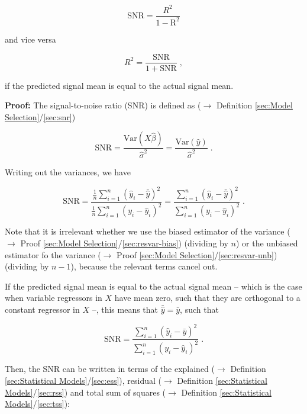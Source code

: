 \documentclass[a4paper,12pt,twoside]{book}
\begin{document}
\begin{equation} \label{eq:snr-rsq-SNR-R2}
\mathrm{SNR} = \frac{R^2}{\mathrm{1-R^2}}
\end{equation}

and vice versa

\begin{equation} \label{eq:snr-rsq-R2-SNR}
R^2 = \frac{\mathrm{SNR}}{\mathrm{1+\mathrm{SNR}}} \; ,
\end{equation}

if the predicted signal mean is equal to the actual signal mean.


\vspace{1em}
\textbf{Proof:} The signal-to-noise ratio (SNR) is defined as ($\rightarrow$ Definition \ref{sec:Model Selection}/\ref{sec:snr})

\begin{equation} \label{eq:snr-rsq-SNR}
\mathrm{SNR} = \frac{\mathrm{Var}(X\hat{\beta})}{\hat{\sigma}^2} = \frac{\mathrm{Var}(\hat{y})}{\hat{\sigma}^2} \; .
\end{equation}

Writing out the variances, we have

\begin{equation} \label{eq:snr-rsq-SNR-s1}
\mathrm{SNR} = \frac{\frac{1}{n} \sum_{i=1}^{n} (\hat{y}_i - \bar{\hat{y}})^2}{\frac{1}{n} \sum_{i=1}^{n} (y_i - \hat{y}_i)^2} = \frac{\sum_{i=1}^{n} (\hat{y}_i - \bar{\hat{y}})^2}{\sum_{i=1}^{n} (y_i - \hat{y}_i)^2} \; .
\end{equation}

Note that it is irrelevant whether we use the biased estimator of the variance ($\rightarrow$ Proof \ref{sec:Model Selection}/\ref{sec:resvar-bias}) (dividing by $n$) or the unbiased estimator fo the variance ($\rightarrow$ Proof \ref{sec:Model Selection}/\ref{sec:resvar-unb}) (dividing by $n-1$), because the relevant terms cancel out.

If the predicted signal mean is equal to the actual signal mean -- which is the case when variable regressors in $X$ have mean zero, such that they are orthogonal to a constant regressor in $X$ --, this means that $\bar{\hat{y}} = \bar{y}$, such that

\begin{equation} \label{eq:snr-rsq-SNR-s2}
\mathrm{SNR} = \frac{\sum_{i=1}^{n} (\hat{y}_i - \bar{y})^2}{\sum_{i=1}^{n} (y_i - \hat{y}_i)^2} \; .
\end{equation}

Then, the SNR can be written in terms of the explained ($\rightarrow$ Definition \ref{sec:Statistical Models}/\ref{sec:ess}), residual ($\rightarrow$ Definition \ref{sec:Statistical Models}/\ref{sec:rss}) and total sum of squares ($\rightarrow$ Definition \ref{sec:Statistical Models}/\ref{sec:tss}):
\end{document}
